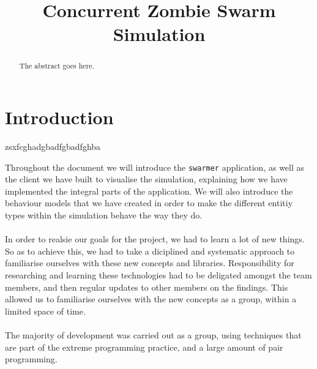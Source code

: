 \documentclass[10pt, a4paper, conference, compsocconf]{IEEEtran}
\begin{document}
\title{Concurrent Zombie Swarm Simulation}

\author{
\and
{}
\and
{}
}
\maketitle

\begin{abstract}
The abstract goes here.
\end{abstract}

\section{Introduction \label{intro}}
zsxfcghadgbadfgbadfghba

Throughout the document we will introduce the \verb+swarmer+ application, as well as the client we have built to visualise the simulation, explaining how we have implemented the integral parts of the application. We will also introduce the behaviour models that we have created in order to make the different entitiy types within the simulation behave the way they do.\\
\\
In order to realsie our goals for the project, we had to learn a lot of new things. So as to achieve this, we had to take a diciplined and systematic approach to familiarise ourselves with these new concepts and libraries. Responsibility for researching and learning these technologies had to be deligated amongst the team members, and then regular updates to other members on the findings. This allowed us to familiarise ourselves with the new concepts as a group, within a limited space of time.\\
\\
The majority of development was carried out as a group, using techniques that are part of the extreme programming practice, and a large amount of pair programming.\\
\\
\end{document}
